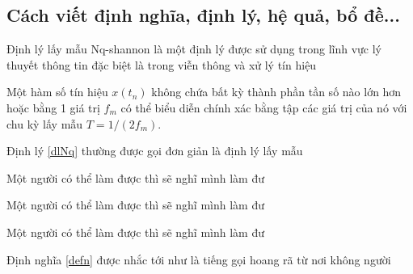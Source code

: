 \subsection{Cách viết định nghĩa, định lý, hệ quả, bổ đề...}
Định lý lấy mẫu Nq-shannon là một định lý được sử dụng trong lĩnh vực lý thuyết thông tin đặc biệt là trong viễn thông và xử lý tín hiệu 
\begin{theorem} %
    \label{dlNq}
    Một hàm số tín hiệu  $x(t_n)$ không chứa bất kỳ thành phần tần số nào lớn hơn hoặc bằng 1 giá trị $f_m$ có thể biểu diễn chính xác bằng tập các giá trị của nó với chu kỳ lấy mẫu $T = 1/(2f_m)$.
\end{theorem}
Định lý \ref{dlNq} thường được gọi đơn giản là định lý lấy mẫu 
\begin{corollary}
    Một người có thể làm được thì sẽ nghĩ mình làm đư
\end{corollary}
\begin{lemma}
    Một người có thể làm được thì sẽ nghĩ mình làm đư
\end{lemma}
\begin{defn}
    \label{defn}
    Một người có thể làm được thì sẽ nghĩ mình làm đư
\end{defn}
Định nghĩa \ref{defn} được nhắc tới như là tiếng gọi hoang rã từ nơi không người
\cleardoublepage